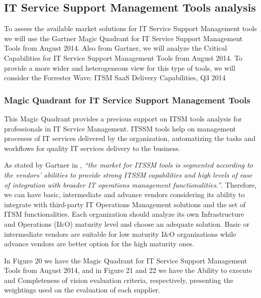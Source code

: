 \subsection{IT Service Support Management Tools analysis}

To assess the available market solutions for IT Service Support Management tools we will use the Gartner Magic Quadrant for IT Service Support Management Tools from August 2014\cite{magicQuadrantITSM}. Also from Gartner, we will analyze the Critical Capabilities for IT Service Support Management Tools from August 2014\cite{criticalCapabilitiesITSM}. To provide a more wider and heterogeneous view for this type of tools, we will consider the Forrester Wave: ITSM SaaS Delivery Capabilities, Q3 2014\cite{forresterWaveITSM}\par 

\subsubsection{Magic Quadrant for IT Service Support Management Tools}

This Magic Quadrant provides a precious support on ITSM tools analysis for professionals in IT Service Management. ITSSM tools help on management processes of IT services delivered by the organization, automatizing the tasks and workflows for quality IT services delivery to the business.\par
As stated by Gartner in \cite{magicQuadrantITSM}, \textit{``the market for ITSSM tools is segmented according to the vendors' abilities to provide strong ITSSM capabilities and high levels of ease of integration with broader IT operations management functionalities.''}. Therefore, we can have basic, intermediate and advance vendors considering its ability to integrate with third-party IT Operations Management solutions and the set of ITSM functionalities. Each organization should analyze its own Infrastructure and Operations (I\&O) maturity level and choose an adequate solution. Basic or intermediate vendors are suitable for low maturity I\&O organizations while advance vendors are better option for the high maturity ones.\par
In Figure 20 we have the Magic Quadrant for IT Service Support Management Tools from August 2014, and in Figure 21 and 22 we have the Ability to execute and Completeness of vision evaluation criteria, respectively, presenting the weightings used on the evaluation of each supplier.\par


